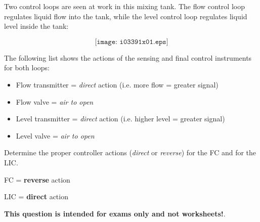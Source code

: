 

Two control loops are seen at work in this mixing tank.  The flow control loop regulates liquid flow into the tank, while the level control loop regulates liquid level inside the tank:

$$\texttt{[image: i03391x01.eps]}$$

The following list shows the actions of the sensing and final control instruments for both loops:

\begin{itemize}
\item{} Flow transmitter = {\it direct} action (i.e. more flow = greater signal)
\item{} Flow valve = {\it air to open} 
\item{} Level transmitter = {\it direct} action (i.e. higher level = greater signal)
\item{} Level valve = {\it air to open}
\end{itemize}

Determine the proper controller actions ({\it direct} or {\it reverse}) for the FC and for the LIC.







FC = {\bf reverse} action

LIC = {\bf direct} action







{\bf This question is intended for exams only and not worksheets!}.



